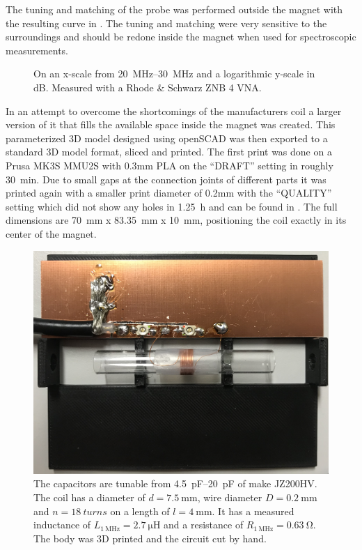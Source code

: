 The tuning and matching of the probe was performed outside the magnet with the resulting curve in . The tuning and matching were very sensitive to the surroundings and should be redone inside the magnet when used for spectroscopic measurements.

\begin{figure}[hbt]
    \centering
    
    \caption{ On an x-scale from \qtyrange{20}{30}{\mega\hertz} and a logarithmic y-scale in \unit{\deci\bel}. Measured with a Rhode \& Schwarz ZNB 4 VNA.}
\end{figure}

In an attempt to overcome the shortcomings of the manufacturers coil a larger version of it that fills the available space inside the magnet was created. This parameterized 3D model designed using openSCAD was then exported to a standard 3D model format, sliced and printed. The first print was done on a Prusa MK3S MMU2S with 0.3mm PLA on the \enquote{DRAFT} setting in roughly \qty{30}{\minute}. Due to small gaps at the connection joints of different parts it was printed again with a smaller print diameter of 0.2mm with the \enquote{QUALITY} setting which did not show any holes in \qty{1.25}{\hour} and can be found in . The full dimensions are \qty{70}{\milli\metre} x \qty{83.35}{\milli\metre} x \qty{10}{\milli\metre}, positioning the coil exactly in its center of the magnet.

\begin{figure}[hbt]
    \centering
    \includegraphics[width=\textwidth]{images/probe.jpg}
    \caption{ The capacitors are tunable from \qtyrange{4.5}{20}{\pico\farad} of make JZ200HV. The coil has a diameter of \(d = \qty{7.5}{\milli\meter}\), wire diameter \(D = \qty{0.2}{\milli\meter}\) and \(n = \qty{18}{turns}\) on a length of \(l = \qty{4}{\milli\meter}\). It has a measured inductance of \(L_{\qty{1}{\mega\hertz}} = \qty{2.7}{\micro\henry}\) and a resistance of \(R_{\qty{1}{\mega\hertz}} = \qty{0.63}{\ohm}\). The body was 3D printed and the circuit cut by hand.}
\end{figure}

